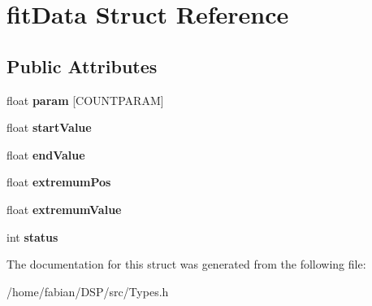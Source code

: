 \hypertarget{structfitData}{\section{fit\-Data Struct Reference}
\label{structfitData}
}
\subsection*{Public Attributes}
\begin{DoxyCompactItemize}
\item 
\hypertarget{structfitData_a9dc59837acfda1ff57f3c8c450c4b34f}{float {\bfseries param} \mbox{[}C\-O\-U\-N\-T\-P\-A\-R\-A\-M\mbox{]}}\label{structfitData_a9dc59837acfda1ff57f3c8c450c4b34f}

\item 
\hypertarget{structfitData_a43ca55a48f87d4ee4b56b967f42b2d20}{float {\bfseries start\-Value}}\label{structfitData_a43ca55a48f87d4ee4b56b967f42b2d20}

\item 
\hypertarget{structfitData_a5378631adb5adbf16fce978a23ee274e}{float {\bfseries end\-Value}}\label{structfitData_a5378631adb5adbf16fce978a23ee274e}

\item 
\hypertarget{structfitData_a49e033dcf62bab8507d9c48944f12ec3}{float {\bfseries extremum\-Pos}}\label{structfitData_a49e033dcf62bab8507d9c48944f12ec3}

\item 
\hypertarget{structfitData_a496cb36cda36d83a894b0862ad9197ce}{float {\bfseries extremum\-Value}}\label{structfitData_a496cb36cda36d83a894b0862ad9197ce}

\item 
\hypertarget{structfitData_a3da54e3b439a7153caf422556b57686e}{int {\bfseries status}}\label{structfitData_a3da54e3b439a7153caf422556b57686e}

\end{DoxyCompactItemize}


The documentation for this struct was generated from the following file\-:\begin{DoxyCompactItemize}
\item 
/home/fabian/\-D\-S\-P/src/Types.\-h\end{DoxyCompactItemize}
